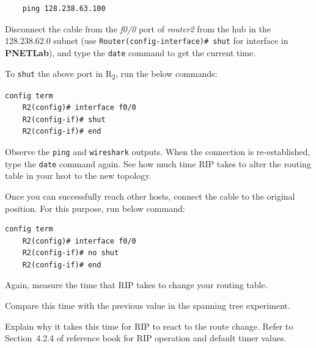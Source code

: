 \documentclass{UTNetLab}
\begin{document}
    \begin{lstlisting}
    ping 128.238.63.100					
    \end{lstlisting}

    Disconnect the cable from the \textit{f0/0} port of \textit{router2} from the hub in the 128.238.62.0 subnet (use \lstinline[language={cisco}]{Router(config-interface)# shut} for interface in \textbf{PNETLab}), and type the \lstinline{date} command to get the current time.
    
    To  \lstinline{shut} the above port in R\textsubscript{2}, run the below commands:
    
    \begin{lstlisting}[frame=trBL, language=cisco]
    config term
    R2(config)# interface f0/0
    R2(config-if)# shut
    R2(config-if)# end
    \end{lstlisting}

    
    Observe the \lstinline{ping} and \lstinline{wireshark} outputs.
    When the connection is re-established, type the \lstinline{date} command again.
    See how much time RIP takes to alter the routing table in your hsot to the new topology.

    Once you can successfully reach other hosts, connect the cable to the original position. For this purpose, run below command:
        
    \begin{lstlisting}[frame=trBL, language=cisco]
    config term
    R2(config)# interface f0/0
    R2(config-if)# no shut
    R2(config-if)# end
    \end{lstlisting}
    
    Again, measure the time that RIP takes to change your routing table.
    
    \begin{report}
    \item Compare this time with the previous value in the spanning tree experiment.

    \item Explain why it takes this time for RIP to react to the route change.
        Refer to Section~4.2.4 of reference book for RIP operation and default timer values.
    \end{report}
\end{document}
